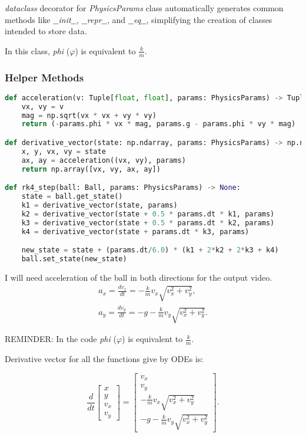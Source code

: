 \documentclass{article}
\begin{document}
\textit{\MVAt dataclass} decorator for \textit{PhysicsParams} class automatically generates common methods like \textit{$\_\_$init$\_\_$}, \textit{$\_\_$repr$\_\_$}, and \textit{$\_\_$eq$\_\_$}, simplifying the creation of classes intended to store data.

In this class, \textit{phi} ($\varphi$) is equivalent to $\frac{k}{m}$.

	\subsubsection*{Helper Methods}
\begin{lstlisting}[language=python]
def acceleration(v: Tuple[float, float], params: PhysicsParams) -> Tuple[float, float]:
	vx, vy = v
	mag = np.sqrt(vx * vx + vy * vy)
	return (-params.phi * vx * mag, params.g - params.phi * vy * mag)

def derivative_vector(state: np.ndarray, params: PhysicsParams) -> np.ndarray:
	x, y, vx, vy = state
	ax, ay = acceleration((vx, vy), params)
	return np.array([vx, vy, ax, ay])

def rk4_step(ball: Ball, params: PhysicsParams) -> None:
	state = ball.get_state()
	k1 = derivative_vector(state, params)
	k2 = derivative_vector(state + 0.5 * params.dt * k1, params)
	k3 = derivative_vector(state + 0.5 * params.dt * k2, params)
	k4 = derivative_vector(state + params.dt * k3, params)

	new_state = state + (params.dt/6.0) * (k1 + 2*k2 + 2*k3 + k4)
	ball.set_state(new_state)
\end{lstlisting}	
	
	I will need acceleration of the ball in both directions for the output video.
	\begin{align*}
		a_x = \frac{d v_x}{dt} = -\frac{k}{m} v_x \sqrt{v_x^2 + v_y^2}, \\
		a_y = \frac{d v_y}{dt} = -g - \frac{k}{m} v_y \sqrt{v_x^2 + v_y^2}.
	\end{align*} 
	
	REMINDER: In the code \textit{phi} ($\varphi$) is equivalent to $\frac{k}{m}$.
	
	Derivative vector for all the functions give by ODEs is:
	
	\begin{equation}
		\frac{d}{dt} 
		\begin{bmatrix}
			x \\ y \\ v_x \\ v_y
		\end{bmatrix}
		=
		\begin{bmatrix}
			v_x \\
			v_y \\
			-\frac{k}{m} v_x \sqrt{v_x^2 + v_y^2} \\
			-g - \frac{k}{m} v_y \sqrt{v_x^2 + v_y^2}
		\end{bmatrix}.
	\end{equation}
	
\end{document}

